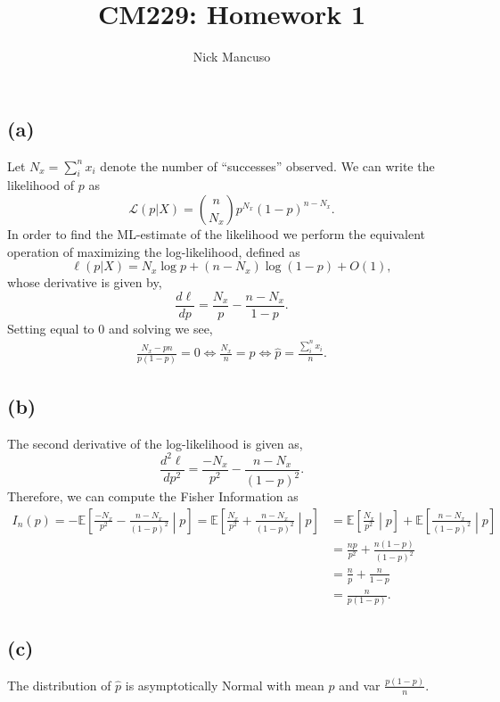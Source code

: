 \documentclass[10pt]{article}
\def\E{\mathbb{E}}
\begin{document}
\title{CM229: Homework 1}
\author{Nick Mancuso}
\maketitle

\section{}
\subsection*{(a)}
Let $N_x = \sum_i^n x_i$ denote the number of ``successes'' observed. We can write the
likelihood of $p$ as \[ \mathcal{L}(p| X) = {n \choose N_x} p^{N_x} (1 - p)^{n - N_x}.\] In order
to find the ML-estimate of the likelihood we perform the equivalent operation of maximizing the
log-likelihood, defined as \[\ell(p | X) = N_x \log p + (n - N_x) \log (1 - p) + O(1),\] whose
derivative is given by, \[ \frac{d \ell}{d p} = \frac{N_x}{p} - \frac{n - N_x}{1 - p}.\] Setting
equal to 0 and solving we see,
\begin{align*}
    \frac{N_x - pn}{p(1 - p)} = 0 \Leftrightarrow 
    \frac{N_x}{n} = p \Leftrightarrow 
    \hat{p} = \frac{\sum_i^n x_i}{n}.
\end{align*}

\subsection*{(b)}
The second derivative of the log-likelihood is given as, 
\[ \frac{d^2 \ell}{d p^2} = \frac{-N_x}{p^2} - \frac{n - N_x}{(1 - p)^2}.\] Therefore, we can
compute the Fisher Information as
\begin{align*}
    I_n(p) = -\E\left[\frac{-N_x}{p^2} - \frac{n - N_x}{(1 - p)^2} \middle\rvert p \right] = 
    \E\left[\frac{N_x}{p^2} + \frac{n - N_x}{(1 - p)^2} \middle\rvert p \right]
    &= \E\left[\frac{N_x}{p^2} \middle\rvert p\right] + \E\left[\frac{n - N_x}{(1 - p)^2} \middle\rvert p \right] \\
    &= \frac{n p}{p^2} + \frac{n (1 - p)}{(1 - p)^2}\\
    &= \frac{n}{p} + \frac{n}{1 - p} \\
    &= \frac{n}{p(1 - p)}.
\end{align*}
\subsection*{(c)}
The distribution of $\hat{p}$ is asymptotically Normal with mean $p$ and var $\frac{p(1 - p)}{n}$.
\end{document}

